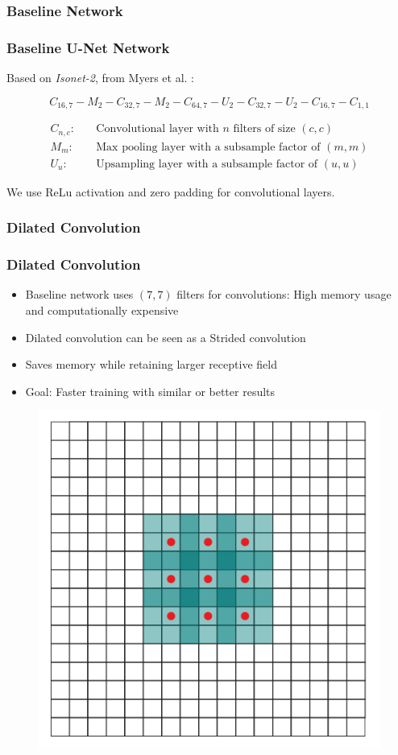 \documentclass{beamer}
\begin{document}
\subsubsection{Baseline Network}
\begin{frame}
    \frametitle{Baseline U-Net Network}
    Based on \textit{Isonet-2}, from Myers et al. \cite{WEIGERT2017}:

    \begin{equation*}
        C_{16, 7} - M_{2} - C_{32, 7} - M_{2} - C_{64, 7} - U_{2} - C_{32, 7} - U_{2} - C_{16, 7} - C_{1, 1}
    \end{equation*}

    \begin{align*}
        C_{n, c}:\quad &\text{Convolutional layer with $n$ filters of size $(c, c)$}\\
        M_{m}:\quad &\text{Max pooling layer with a subsample factor of $(m, m)$}\\
        U_{u}:\quad &\text{Upsampling layer with a subsample factor of $(u, u)$}
    \end{align*}

    We use ReLu activation and zero padding for convolutional layers.
\end{frame}


\subsubsection{Dilated Convolution}
\begin{frame}
    \frametitle{Dilated Convolution}
    \begin{itemize}
        \item Baseline network uses $(7, 7)$ filters for convolutions: High memory usage and computationally expensive
        \item Dilated convolution can be seen as a Strided convolution
        \item Saves memory while retaining larger receptive field
        \item Goal: Faster training with similar or better results
    \end{itemize}
    \begin{figure}[h]
        \center%
        \includegraphics[width=0.3\columnwidth]{../report/figures/dilated.png}
    \end{figure}
\end{frame}
\end{document}
